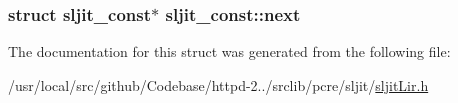 \subsubsection[{\texorpdfstring{next}{next}}]{\setlength{\rightskip}{0pt plus 5cm}struct {\bf sljit\+\_\+const}$\ast$ sljit\+\_\+const\+::next}\hypertarget{structsljit__const_a0fb6ce6e06520b5ac62b1ffd9bf994ec}{}\label{structsljit__const_a0fb6ce6e06520b5ac62b1ffd9bf994ec}


The documentation for this struct was generated from the following file\+:\begin{DoxyCompactItemize}
\item 
/usr/local/src/github/\+Codebase/httpd-\/2../srclib/pcre/sljit/\hyperlink{sljitLir_8h}{sljit\+Lir.\+h}\end{DoxyCompactItemize}
